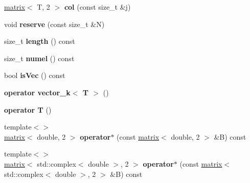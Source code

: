 \begin{DoxyCompactItemize}
\item 
\hypertarget{classkeycpp_1_1matrix_a97af00468499faef7493168119ca88fa}{\hyperlink{classkeycpp_1_1matrix}{matrix}$<$ T, 2 $>$ {\bfseries col} (const size\-\_\-t \&j)}\label{classkeycpp_1_1matrix_a97af00468499faef7493168119ca88fa}

\item 
\hypertarget{classkeycpp_1_1matrix_aed824ccff1fa8367ebf759704e063e36}{void {\bfseries reserve} (const size\-\_\-t \&N)}\label{classkeycpp_1_1matrix_aed824ccff1fa8367ebf759704e063e36}

\item 
\hypertarget{classkeycpp_1_1matrix_a3c5754fe0f3d99022ca5b9f302fdabaf}{size\-\_\-t {\bfseries length} () const }\label{classkeycpp_1_1matrix_a3c5754fe0f3d99022ca5b9f302fdabaf}

\item 
\hypertarget{classkeycpp_1_1matrix_a8233b1486b19743833cd7b166406cadf}{size\-\_\-t {\bfseries numel} () const }\label{classkeycpp_1_1matrix_a8233b1486b19743833cd7b166406cadf}

\item 
\hypertarget{classkeycpp_1_1matrix_a01f007273ad64facaffdc0a8ab2b230a}{bool {\bfseries is\-Vec} () const }\label{classkeycpp_1_1matrix_a01f007273ad64facaffdc0a8ab2b230a}

\item 
\hypertarget{classkeycpp_1_1matrix_aae00b6698c9910ac76c1467877b66b07}{{\bfseries operator vector\-\_\-k$<$ T $>$} ()}\label{classkeycpp_1_1matrix_aae00b6698c9910ac76c1467877b66b07}

\item 
\hypertarget{classkeycpp_1_1matrix_ada003509d697cc3d4a2d1a9ccba44a10}{{\bfseries operator T} ()}\label{classkeycpp_1_1matrix_ada003509d697cc3d4a2d1a9ccba44a10}

\item 
\hypertarget{classkeycpp_1_1matrix_a37ff7d47a6219cf17fb4ebde48f8c7b2}{{\footnotesize template$<$$>$ }\\\hyperlink{classkeycpp_1_1matrix}{matrix}$<$ double, 2 $>$ {\bfseries operator$\ast$} (const \hyperlink{classkeycpp_1_1matrix}{matrix}$<$ double, 2 $>$ \&B) const}\label{classkeycpp_1_1matrix_a37ff7d47a6219cf17fb4ebde48f8c7b2}

\item 
\hypertarget{classkeycpp_1_1matrix_af5588cdcb9eef1da2fe80623204c5199}{{\footnotesize template$<$$>$ }\\\hyperlink{classkeycpp_1_1matrix}{matrix}$<$ std\-::complex$<$ double $>$, 2 $>$ {\bfseries operator$\ast$} (const \hyperlink{classkeycpp_1_1matrix}{matrix}$<$ std\-::complex$<$ double $>$, 2 $>$ \&B) const}\label{classkeycpp_1_1matrix_af5588cdcb9eef1da2fe80623204c5199}

\end{DoxyCompactItemize}
